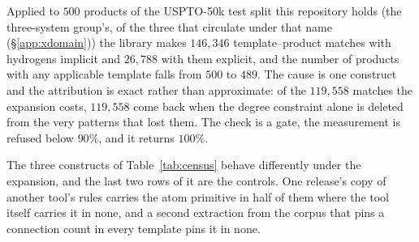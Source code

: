 Applied to $500$ products of the USPTO-50k test split this repository holds (the
three-system group's, of the three that circulate under that name (\S\ref{app:xdomain})) the library makes $146{,}346$
template--product matches with hydrogens implicit and $26{,}788$ with them explicit, and the number
of products with any applicable template falls from $500$ to $489$. The cause is one construct and
the attribution is exact rather than approximate: of the $119{,}558$ matches the expansion costs,
$119{,}558$ come back when the degree constraint alone is deleted from the very patterns that lost
them. The check is a gate, the measurement is refused below $90\%$, and it returns $100\%$.

The three constructs of Table~\ref{tab:census} behave differently under the expansion, and the last
two rows of it are the controls. One release's copy of another tool's rules carries the atom primitive in half of them
where the tool itself carries it in none, and a second extraction from the corpus that pins a
connection count in every template pins it in none.

